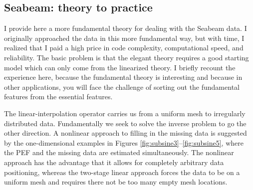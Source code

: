 %
%

\subsection{Seabeam: theory to practice}
I provide here a more fundamental theory for dealing with
the Seabeam data.
I originally approached the data in this more fundamental way,
but with time, I realized that I paid a high price in
code complexity, computational speed, and reliability.
The basic problem is that the elegant theory
requires a good starting model
which can only come from the linearized theory.
I briefly recount the experience here,
because the fundamental theory is interesting
and because in other applications,
you will face the challenge of sorting out
the fundamental features from the essential features.
\par
{}
The linear-interpolation operator
carries us from a uniform mesh to irregularly distributed data.
Fundamentally we seek to solve the inverse problem to go
the other direction.
A nonlinear approach to filling in the missing data is suggested by
the one-dimensional examples in Figures
\ref{fig:subsine3}--\ref{fig:subsine5},
where the PEF and the missing data are estimated simultaneously.
The nonlinear approach has the advantage that it allows for
completely arbitrary data positioning,
whereas the two-stage linear approach
forces the data to be on a uniform mesh
and requires there not be too many empty mesh locations.

